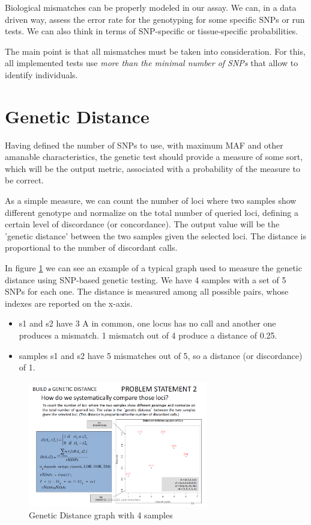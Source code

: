 \bigskip
Biological mismatches can be properly modeled in our assay. We can, in a data driven way, assess the error rate for the genotyping for some specific SNPs or run tests. We can also think in terms of SNP-specific or tissue-specific probabilities.

The main point is that all mismatches must be taken into consideration. 
For this, all implemented tests use \emph{more than the minimal number of SNPs} that allow to identify individuals. 


\section*{Genetic Distance}

Having defined the number of SNPs to use, with maximum MAF and other amanable characteristics, the genetic test should provide a measure of some sort, which will be the output metric, associated with a probability of the measure to be correct. 

As a simple measure, we can count the number of loci where two samples show different genotype and normalize on the total number of queried loci, defining a certain level of discordance (or concordance). The output value will be the 'genetic distance' between the two samples given the selected loci. The distance is proportional to the number of discordant calls.

In figure \ref{fig:Distance} we can see an example of a typical graph used to measure the genetic distance using SNP-based genetic testing. We have 4 samples with a set of 5 SNPs for each one. The distance is measured among all possible pairs, whose indexes are reported on the x-axis. 
\begin{itemize}
	\item s1 and s2 have 3 A in common, one locus has no call and another one produces a mismatch. 1 mismatch out of 4 produce a distance of 0.25.
	\item samples s1 and s2 have 5 mismatches out of 5, so a distance (or discordance) of 1. 
\end{itemize}

\begin{figure}
	\centering
	\includegraphics[width=0.7\textwidth]{Images/Distance.PNG}
	\caption{\label{fig:Distance}Genetic Distance graph with 4 samples}
\end{figure}

